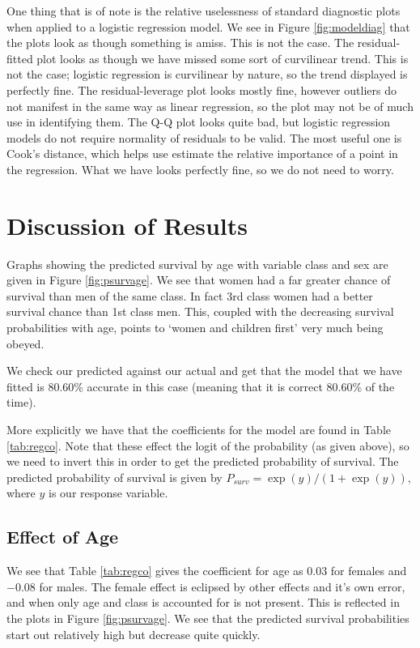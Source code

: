 \documentclass[9pt]{extarticle}
\begin{document}
One thing that is of note is the relative uselessness of standard diagnostic plots when applied to a logistic regression model. We see in Figure \ref{fig:modeldiag} that the plots look as though something is amiss. This is not the case. The residual-fitted plot looks as though we have missed some sort of curvilinear trend. This is not the case; logistic regression is curvilinear by nature, so the trend displayed is perfectly fine. The residual-leverage plot looks mostly fine, however outliers do not manifest in the same way as linear regression, so the plot may not be of much use in identifying them. The Q-Q plot looks quite bad, but logistic regression models do not require normality of residuals to be valid. The most useful one is Cook's distance, which helps use estimate the relative importance of a point in the regression. What we have looks perfectly fine, so we do not need to worry.

\section{Discussion of Results}

Graphs showing the predicted survival by age with variable class and sex are given in Figure \ref{fig:psurvage}. We see that women had a far greater chance of survival than men of the same class. In fact 3rd class women had a better survival chance than 1st class men. This, coupled with the decreasing survival probabilities with age, points to `women and children first' very much being obeyed. 

We check our predicted against our actual and get that the model that we have fitted is 80.60\% accurate in this case (meaning that it is correct 80.60\% of the time). 

More explicitly we have that the coefficients for the model are found in Table \ref{tab:regco}. Note that these effect the logit of the probability (as given above), so we need to invert this in order to get the predicted probability of survival. The predicted probability of survival is given by $P_{surv} = \exp(y)/(1+\exp(y)),$ where $y$ is our response variable.
\subsection{Effect of Age}

We see that Table \ref{tab:regco} gives the coefficient for age as $0.03$ for females and $-0.08$ for males. The female effect is eclipsed by other effects and it's own error, and when only age and class is accounted for is not present. This is reflected in the plots in Figure \ref{fig:psurvage}. We see that the predicted survival probabilities start out relatively high but decrease quite quickly.
\end{document}
